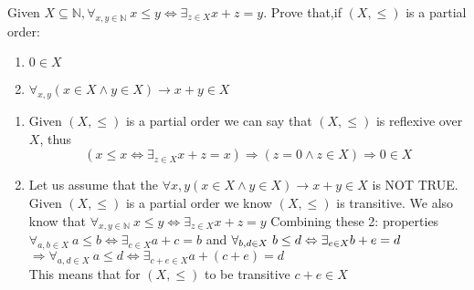 \documentclass[12pt]{article}
\newcommand{\N}{\mathbb{N}}
\newenvironment{solution}[2][Solution]{ \begin{trivlist}
\item[\hskip \labelsep {\bfseries #1}]}{\end{trivlist}}
\newenvironment{problem}[2][Problem]{\begin{trivlist}
\item[\hskip \labelsep {\bfseries #1}\hskip \labelsep {\bfseries #2.}]}{\end{trivlist}}
\begin{document}
\begin{problem}{10}Given $X \subseteq \N, \forall_{x,y\in\N}\ x \le y \Leftrightarrow \exists_{z \in X} x+z=y$. Prove that,if $(X,\le)$ is a partial order:
\item[]
\begin{enumerate}[label=\alph*)]
    \item $0 \in X$
    \item $\forall_{x,y} (x \in X \wedge y \in X) \rightarrow x + y \in X$
\end{enumerate}
\end{problem}
\begin{solution}{7}
\item[]
\begin{enumerate}[label=\alph*)]
    \item Given $(X,\le)$ is a partial order we can say that $(X,\le)$ is reflexive over $X$,
    thus $$(x \le x \Leftrightarrow \exists_{z \in X} x+z=x) \Rightarrow (z = 0 \wedge z \in X) \Rightarrow 0 \in X$$
    \item Let us assume that the $\forall x,y (x \in X \wedge y \in X) \rightarrow x + y \in X $ is NOT TRUE.\\ Given $(X,\le)$ is a partial order we know $(X,\le)$ is transitive. We also know that $\forall_{x,y\in\N}\ x \le y \Leftrightarrow \exists_{z \in X} x+z=y$ Combining these 2: properties \\ $\forall_{a,b\in X}\ a \le b \Leftrightarrow \exists_{c \in X} a+c=b$ and $\forall_{b,d\in X}\ b \le d \Leftrightarrow \exists_{e \in X} b+e=d \\$ $\Rightarrow \forall_{a,d\in X}\ a \le d \Leftrightarrow \exists_{c+e \in X} a+(c+e)=d$ \\
    This means that for $(X,\le)$ to be transitive $c+e \in X $
\end{enumerate}
\end{solution}

\vskip 0.5in
\end{document}
